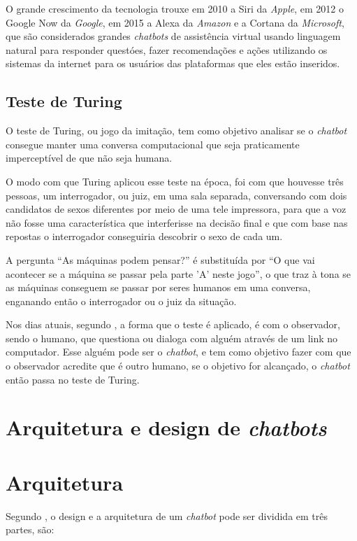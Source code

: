 \documentclass[
	12pt,				%
	oneside,
	a4paper,			%
	english,			%
	french,				%
	spanish,			%
	brazil				%
	]{abntex2}
\begin{document}
O grande crescimento da tecnologia trouxe em 2010 a Siri da \emph{Apple}, em 2012 o Google Now da \emph{Google}, em 2015 a Alexa da \emph{Amazon} e a Cortana da \emph{Microsoft}, que são considerados grandes \emph{chatbots} de assistência virtual usando linguagem natural para responder questóes, fazer recomendações e ações utilizando os sistemas da internet para os usuários das plataformas que eles estão inseridos.


\subsection{Teste de Turing}
O teste de Turing, ou jogo da imitação, tem como objetivo analisar se o \emph{chatbot} consegue manter uma conversa computacional que seja praticamente imperceptível de que não seja humana.

O modo com que Turing aplicou esse teste na época, foi com que houvesse três pessoas, um interrogador, ou juiz, em uma sala separada, conversando com dois candidatos de sexos diferentes por meio de uma tele impressora, para que a voz não fosse uma característica que interferisse na decisão final e que com base nas repostas o interrogador conseguiria descobrir o sexo de cada um.

A pergunta “As máquinas podem pensar?” é substituída por “O que vai acontecer se a máquina se passar pela parte 'A' neste jogo”, o que traz à tona se as máquinas conseguem se passar por seres humanos em uma conversa, enganando então o interrogador ou o juiz da situação.\cite{Turing}

Nos dias atuais, segundo \textcite{LukaBradesko}, a forma que o teste é aplicado, é com o observador, sendo o humano, que questiona ou dialoga com alguém através de um link no computador. Esse alguém pode ser o \emph{chatbot}, e tem como objetivo fazer com que o observador acredite que é outro humano, se o objetivo for alcançado, o \emph{chatbot} então passa no teste de Turing.


\section{Arquitetura e design de \emph{chatbots}}
\section{Arquitetura}
Segundo \textcite{Abdul-Kader2015}, o design e a arquitetura de um \emph{chatbot} pode ser dividida em três partes, são:
\end{document}
